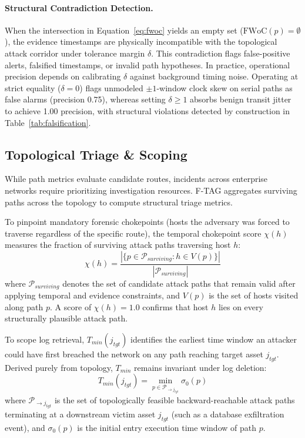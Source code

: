 \documentclass[12pt]{article}
\begin{document}
\paragraph{Structural Contradiction Detection.}
When the intersection in Equation~\ref{eq:fwoc} yields an empty set ($\text{FWoC}(p) = \emptyset$), the evidence timestamps are physically incompatible with the topological attack corridor under tolerance margin $\delta$. This contradiction flags false-positive alerts, falsified timestamps, or invalid path hypotheses. In practice, operational precision depends on calibrating $\delta$ against background timing noise. Operating at strict equality ($\delta=0$) flags unmodeled $\pm 1$-window clock skew on serial paths as false alarms (precision 0.75), whereas setting $\delta \ge 1$ absorbs benign transit jitter to achieve 1.00 precision, with structural violations detected by construction in Table~\ref{tab:falsification}.

\subsection{Topological Triage \& Scoping}\label{sec:network-metrics}

While path metrics evaluate candidate routes, incidents across enterprise networks require prioritizing investigation resources. F-TAG aggregates surviving paths across the topology to compute structural triage metrics.

To pinpoint mandatory forensic chokepoints (hosts the adversary was forced to traverse regardless of the specific route), the temporal chokepoint score $\chi(h)$ measures the fraction of surviving attack paths traversing host $h$:
\begin{equation}\label{eq:chokepoint}
\chi(h) = \frac{|\{p \in \mathcal{P}_{surviving} : h \in V(p)\}|}{|\mathcal{P}_{surviving}|}
\end{equation}
where $\mathcal{P}_{surviving}$ denotes the set of candidate attack paths that remain valid after applying temporal and evidence constraints, and $V(p)$ is the set of hosts visited along path $p$. A score of $\chi(h) = 1.0$ confirms that host $h$ lies on every structurally plausible attack path.



To scope log retrieval, $T_{min}(j_{tgt})$ identifies the earliest time window an attacker could have first breached the network on any path reaching target asset $j_{tgt}$. Derived purely from topology, $T_{min}$ remains invariant under log deletion:
\begin{equation}\label{eq:tmin}
T_{min}(j_{tgt}) = \min_{p \in \mathcal{P}_{\to j_{tgt}}} \sigma_0(p)
\end{equation}
where $\mathcal{P}_{\to j_{tgt}}$ is the set of topologically feasible backward-reachable attack paths terminating at a downstream victim asset $j_{tgt}$ (such as a database exfiltration event), and $\sigma_0(p)$ is the initial entry execution time window of path $p$.
\end{document}

